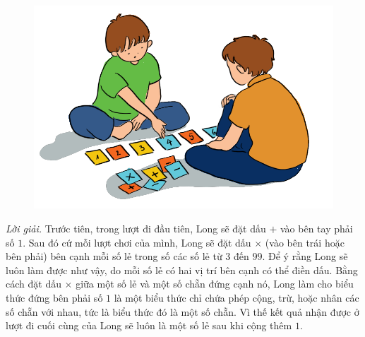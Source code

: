\begin{multicols}{2}
	\begin{figure}[H]
		\centering
		\vspace*{-5pt}
		\captionsetup{labelformat= empty, justification=centering}
		\includegraphics[width=0.7\linewidth]{Pi9_bai6}
		\vspace*{-5pt}
	\end{figure}
	\textit{Lời giải.} 	Trước tiên, trong lượt đi đầu tiên, Long sẽ đặt dấu $+$ vào bên tay phải số $1$. Sau đó cứ mỗi lượt chơi của mình, Long sẽ đặt dấu $\times$ (vào bên trái hoặc bên phải) bên cạnh mỗi số lẻ trong số các số lẻ từ $3$ đến $99$. Để ý rằng Long sẽ luôn làm được như vậy, do mỗi số lẻ có hai vị trí bên cạnh có thể điền dấu. Bằng cách đặt dấu $\times$ giữa một số lẻ và một số chẵn đứng cạnh nó, Long làm cho biểu thức đứng bên phải số $1$ là một biểu thức chỉ chứa phép cộng, trừ, hoặc nhân các số chẵn với nhau, tức là biểu thức đó là một số chẵn. Vì thế kết quả nhận được ở lượt đi cuối cùng của Long sẽ luôn là một số lẻ sau khi cộng thêm $1$. 
\end{multicols}
	\newpage
